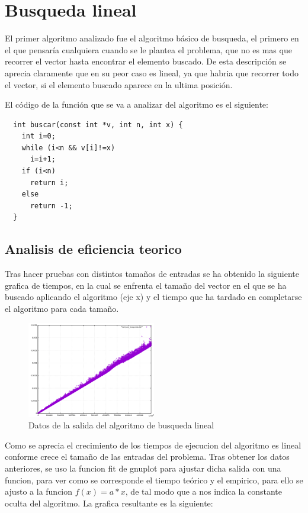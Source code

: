 \section{Busqueda lineal}

El primer algoritmo analizado fue el algoritmo básico de busqueda, el primero en el que pensaría cualquiera cuando se le plantea el problema, que no es mas que recorrer el vector hasta encontrar el elemento buscado. De esta descripción se aprecia claramente que en su peor caso es lineal, ya que habria que recorrer todo el vector, si el elemento buscado aparece en la ultima posición.

El código de la función que se va a analizar del algoritmo es el siguiente:

\begin{lstlisting}
  int buscar(const int *v, int n, int x) {
    int i=0;
    while (i<n && v[i]!=x)
      i=i+1;
    if (i<n)
      return i;
    else
      return -1;
  }
\end{lstlisting}

\subsection{Analisis de eficiencia teorico}

Tras hacer pruebas con distintos tamaños de entradas se ha obtenido la siguiente grafica de tiempos, en la cual se enfrenta el tamaño del vector en el que se ha buscado aplicando el algoritmo (eje x) y el tiempo que ha tardado en completarse el algoritmo para cada tamaño.

\begin{figure}[h]
  \centering
  \includegraphics[width=0.5\textwidth]{./Imagenes/busqueda_lineal.png}
  \caption{Datos de la salida del algoritmo de busqueda lineal}
\end{figure}

Como se aprecia el crecimiento de los tiempos de ejecucion del algoritmo es lineal conforme crece el tamaño de las entradas del problema. Tras obtener los datos anteriores, se uso la funcion fit de gnuplot para ajustar dicha salida con una funcion, para ver como se corresponde el tiempo teórico y el empirico, para ello se ajusto a la funcion $ f(x) = a*x$, de tal modo que a nos indica la constante oculta del algoritmo. La grafica resultante es la siguiente:

